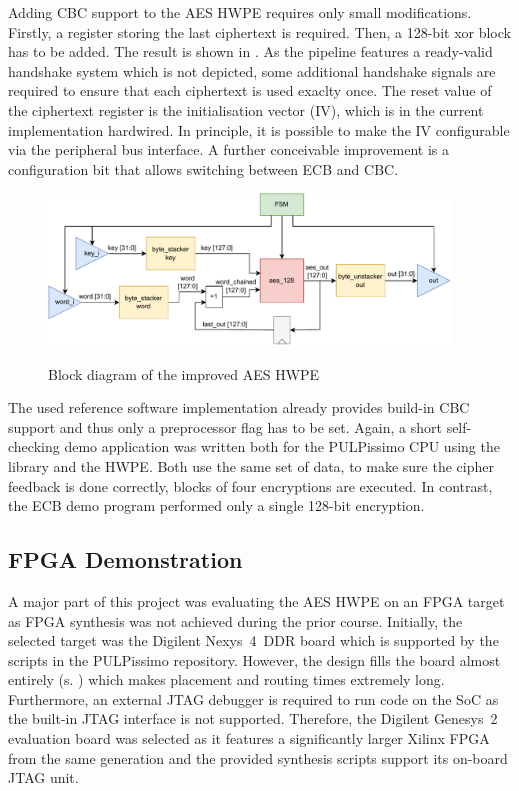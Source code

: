 \documentclass[a4paper, 12pt]{article}
\begin{document}
Adding CBC support to the AES HWPE requires only small modifications. Firstly, a register storing the last ciphertext is required. Then, a 128-bit xor block has to be added. The result is shown in . As the pipeline features a ready-valid handshake system which is not depicted, some additional handshake signals are required to ensure that each ciphertext is used exaclty once. The reset value of the ciphertext register is the initialisation vector (IV), which is in the current implementation hardwired. In principle, it is possible to make the IV configurable via the peripheral bus interface. A further conceivable improvement is a configuration bit that allows switching between ECB and CBC.

\begin{figure} [h]
	\centering
	\includegraphics[width=0.95\textwidth]{hwpe_aes_update.pdf}
	\label{hwpe-aes-update}
	\caption{Block diagram of the improved AES HWPE}
\end{figure}

The used reference software implementation \cite{tiny-aes-c} already provides build-in CBC support and thus only a preprocessor flag has to be set. Again, a short self-checking demo application was written both for the PULPissimo CPU using the library and the HWPE. Both use the same set of data, to make sure the cipher feedback is done correctly, blocks of four encryptions are executed. In contrast, the ECB demo program performed only a single 128-bit encryption.

\subsection{FPGA Demonstration}

A major part of this project was evaluating the AES HWPE on an FPGA target as FPGA synthesis was not achieved during the prior course. Initially, the selected target was the Digilent Nexys~4~DDR board which is supported by the scripts in the PULPissimo repository. However, the design fills the board almost entirely (s. ) which makes placement and routing times extremely long. Furthermore, an external JTAG debugger is required to run code on the SoC as the built-in JTAG interface is not supported. Therefore, the Digilent Genesys~2 evaluation board was selected as it features a significantly larger Xilinx FPGA from the same generation and the provided synthesis scripts support its on-board JTAG unit.
\end{document}
